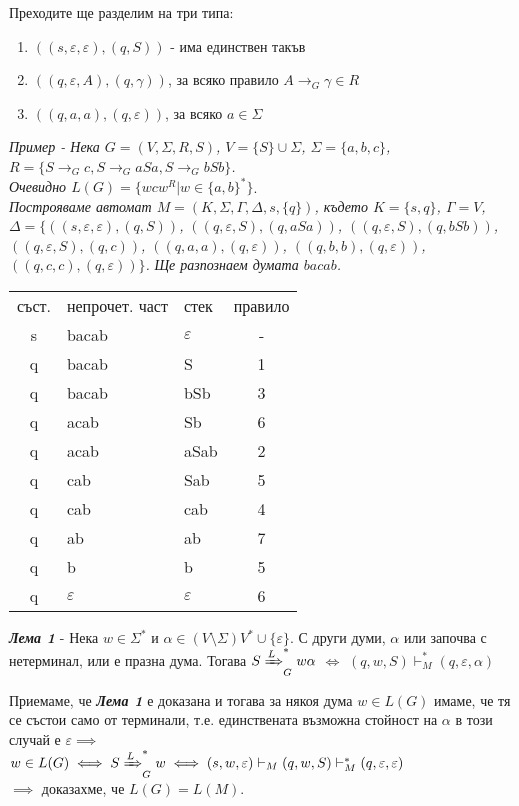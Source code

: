 \documentclass[fleqn,12pt]{article}
\begin{document}
Преходите ще разделим на три типа:
\begin{enumerate}
    \item $((s, \varepsilon, \varepsilon), (q, S))$ - има единствен такъв
    \item \label{transition_type:two} $((q, \varepsilon, A), (q, \gamma))$, за всяко правило $ A \to_G \gamma \in R$
    \item $((q, a, a), (q, \varepsilon))$, за всяко $a \in \Sigma$
\end{enumerate}

\noindent\textit{Пример - Нека $G = (V, \Sigma, R, S)$, $V = \{S\} \cup \Sigma$, $\Sigma = \{a, b, c\}$, $R = \{S \to_G c, S \to_G aSa, S \to_G bSb\}$.} \\
\textit{Очевидно $L(G) = \{wcw^R | w \in \{a, b\}^*\}$}. \\
\textit{Построяваме автомат $M = (K, \Sigma, \Gamma, \Delta, s, \{q\})$, където $K = \{s, q\}$, $\Gamma = V$, $\Delta = \{$$((s, \varepsilon, \varepsilon), (q, S))$, $((q, \varepsilon, S), (q, aSa))$, $((q, \varepsilon, S), (q, bSb))$, $((q, \varepsilon, S), (q, c))$, $((q, a, a), (q, \varepsilon))$, $((q, b, b), (q, \varepsilon))$, $((q, c, c), (q, \varepsilon))$$\}$.}
\textit{Ще разпознаем думата $bacab$.}

\begin{tabular}{ |c|l|l|c| } 
\hline
съст. & непрочет. част & стек & правило \\ 
s & bacab & $\varepsilon$ & - \\
q & bacab & S & 1 \\
q & bacab & bSb & 3 \\
q & acab & Sb & 6 \\
q & acab & aSab & 2 \\
q & cab & Sab & 5 \\
q & cab & cab & 4 \\
q & ab & ab & 7 \\
q & b & b & 5 \\
q & $\varepsilon$ & $\varepsilon$ & 6 \\
\hline
\end{tabular}

\noindent\textit{\textbf{Лема 1}} - Нека $w \in \Sigma^*$ и $\alpha \in (V \setminus \Sigma) V^* \cup \{\varepsilon\}$.
С други думи, $\alpha$ или започва с нетерминал, или е празна дума.
Тогава $S \xRightarrow[]{L}_G^* w\alpha$ $\iff$ $(q, w, S) \vdash_M^* (q, \varepsilon, \alpha)$

Приемаме, че \textit{\textbf{Лема 1}} е доказана и тогава за някоя дума $w \in L(G)$ имаме, че тя се състои само от терминали, т.е. единствената възможна стойност на $\alpha$ в този случай е $\varepsilon \implies$ \\
$w \in L(G) \iff S \xRightarrow[]{L}_G^* w \iff (s, w, \varepsilon) \vdash_M (q, w, S) \vdash_M^* (q, \varepsilon, \varepsilon)$ \\
$\implies$ доказахме, че $L(G) = L(M)$.
\end{document}
